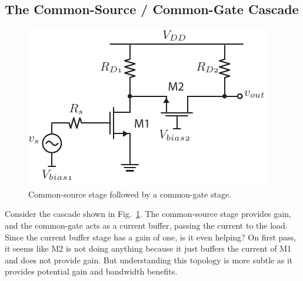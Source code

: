 \subsection{The Common-Source / Common-Gate Cascade}
\begin{figure}[tb]
\centering
\includegraphics[scale=1]{10cs_cg_cascade}
\caption{Common-source stage followed by a common-gate stage.}
\label{fig:10cs_cg_cascade}
\end{figure}
Consider the cascade shown in Fig.~\ref{fig:10cs_cg_cascade}.  The common-source stage provides gain, and the common-gate acts as a current buffer, passing the current to the load.  Since the current buffer stage has a gain of one, is it even helping?  On first pass, it seems like M2 is not doing anything because it just buffers the current of M1 and does not provide gain.  But understanding this topology is more subtle as it provides potential gain and bandwidth benefits.
